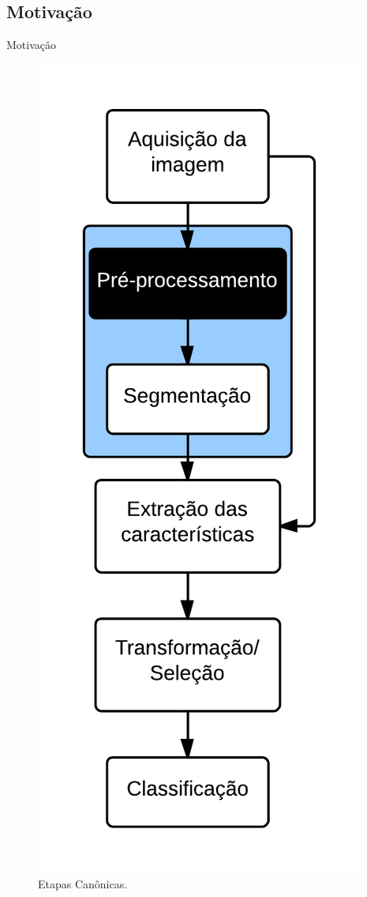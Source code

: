 \documentclass{beamer}
\begin{document}
\subsection{Motivação}
\begin{frame}[plain]{Motivação}
\begin{figure}
    \includegraphics[height=0.9\textheight]{figuras/flow.png}
    \caption{Etapas Canônicas.}
\end{figure}
\end{frame}
\end{document}
